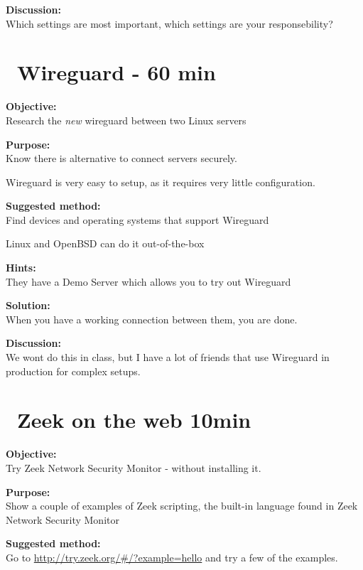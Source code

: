 \documentclass[a4paper,11pt,notitlepage]{report}
\begin{document}
{\bf Discussion:}\\
Which settings are most important, which settings are your responsebility?


\chapter{\faInfoCircle\ Wireguard - 60 min}
\label{ex:wireguard-setup}

{\bf Objective:}\\
Research the \emph{new} wireguard between two Linux servers


{\bf Purpose:}\\
Know there is alternative to connect servers securely.

Wireguard is very easy to setup, as it requires very little configuration.


{\bf Suggested method:}\\
Find devices and operating systems that support Wireguard

Linux and OpenBSD can do it out-of-the-box


{\bf Hints:}\\
They have a Demo Server which allows you to try out Wireguard

{\bf Solution:}\\
When you have a working connection between them, you are done.

{\bf Discussion:}\\
We wont do this in class, but I have a lot of friends that use Wireguard in production for complex setups.





\chapter{\faInfoCircle\ Zeek on the web 10min}
\label{ex:zeekweb}


{\bf Objective:} \\
Try Zeek Network Security Monitor - without installing it.


{\bf Purpose:}\\
Show a couple of examples of Zeek scripting, the built-in language found in Zeek Network Security Monitor


{\bf Suggested method:}\\
Go to \url{http://try.zeek.org/#/?example=hello} and try a few of the examples.
\end{document}
